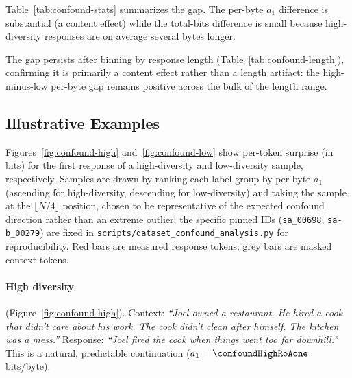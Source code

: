 Table~\ref{tab:confound-stats} summarizes the gap.
The per-byte $a_1$ difference is substantial (a content effect) while the total-bits difference is small because high-diversity responses are on average several bytes longer.

\begin{table}[!htbp]
\centering
\caption{Unconditional surprise ($a_1$) by diversity label, McDiv\_nuggets story\_gen.}\label{tab:confound-stats}

\end{table}

The gap persists after binning by response length (Table~\ref{tab:confound-length}), confirming it is primarily a content effect rather than a length artifact: the high-minus-low per-byte gap remains positive across the bulk of the length range.

\begin{table}[!htbp]
\centering
\caption{Unconditional per-byte surprise by response length bin, story\_gen.}\label{tab:confound-length}

\end{table}

\subsection{Illustrative Examples}\label{sec:mcdiv-examples}

Figures~\ref{fig:confound-high} and~\ref{fig:confound-low} show per-token surprise (in bits) for the first response of a high-diversity and low-diversity sample, respectively.
Samples are drawn by ranking each label group by per-byte $a_1$ (ascending for high-diversity, descending for low-diversity) and taking the sample at the $\lfloor N/4 \rfloor$ position, chosen to be representative of the expected confound direction rather than an extreme outlier; the specific pinned IDs (\texttt{sa\_00698}, \texttt{sa-b\_00279}) are fixed in \texttt{scripts/dataset\_confound\_analysis.py} for reproducibility.
Red bars are measured response tokens; grey bars are masked context tokens.

\paragraph{High diversity} (Figure~\ref{fig:confound-high}).
Context: \emph{``Joel owned a restaurant.
He hired a cook that didn't care about his work.
The cook didn't clean after himself.
The kitchen was a mess.''} Response: \emph{``Joel fired the cook when things went too far downhill.''} This is a natural, predictable continuation ($a_1 = \confoundHighRoAone$ bits/byte).

